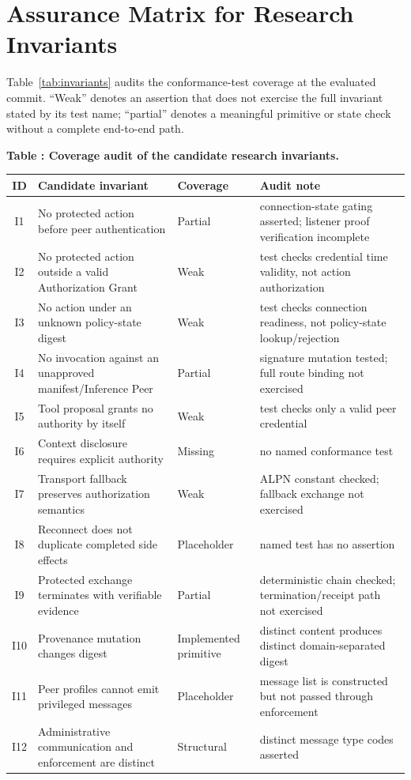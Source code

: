 \documentclass[10pt]{article}
\begin{document}



\clearpage
\onecolumn
\appendix
\section{Assurance Matrix for Research Invariants}

\noindent Table~\ref{tab:invariants} audits the conformance-test coverage at the evaluated commit. ``Weak'' denotes an assertion that does not exercise the full invariant stated by its test name; ``partial'' denotes a meaningful primitive or state check without a complete end-to-end path.

\begin{center}
\small
{}
\label{tab:invariants}
\textbf{Table \thetable: Coverage audit of the candidate research invariants.}\\[4pt]
\begin{tabularx}{\textwidth}{@{}c Y l Y@{}}
\toprule
ID & Candidate invariant & Coverage & Audit note \\
\midrule
I1 & No protected action before peer authentication & Partial & connection-state gating asserted; listener proof verification incomplete \\
I2 & No protected action outside a valid Authorization Grant & Weak & test checks credential time validity, not action authorization \\
I3 & No action under an unknown policy-state digest & Weak & test checks connection readiness, not policy-state lookup/rejection \\
I4 & No invocation against an unapproved manifest/Inference Peer & Partial & signature mutation tested; full route binding not exercised \\
I5 & Tool proposal grants no authority by itself & Weak & test checks only a valid peer credential \\
I6 & Context disclosure requires explicit authority & Missing & no named conformance test \\
I7 & Transport fallback preserves authorization semantics & Weak & ALPN constant checked; fallback exchange not exercised \\
I8 & Reconnect does not duplicate completed side effects & Placeholder & named test has no assertion \\
I9 & Protected exchange terminates with verifiable evidence & Partial & deterministic chain checked; termination/receipt path not exercised \\
I10 & Provenance mutation changes digest & Implemented primitive & distinct content produces distinct domain-separated digest \\
I11 & Peer profiles cannot emit privileged messages & Placeholder & message list is constructed but not passed through enforcement \\
I12 & Administrative communication and enforcement are distinct & Structural & distinct message type codes asserted \\
\bottomrule
\end{tabularx}
\end{center}
\end{document}
